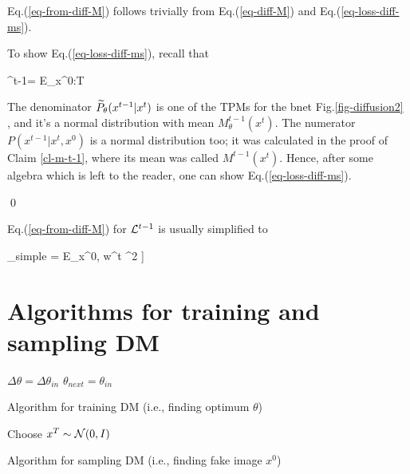 Eq.(\ref{eq-from-diff-M})
 follows trivially from
Eq.(\ref{eq-diff-M})
and Eq.(\ref{eq-loss-diff-ms}).

To show Eq.(\ref{eq-loss-diff-ms}),
 recall that

\beq
\call^{t-1}=
E_{x^{0:T}}
\eeq

The denominator
${\widetilde{P}_\theta}(x^{t-1}|x^t)$
is one of the TPMs for
the bnet Fig.\ref{fig-diffusion2} ,
and it's a normal distribution
with mean $M^{t-1}_\theta(x^t)$.
The numerator
$P(x^{t-1}|x^t,x^0)$ is
a normal distribution too;
it was calculated
in the proof
of Claim \ref{cl-m-t-1},
where its mean was called
$M^{t-1}(x^t)$.
Hence, after
some algebra
which is left to the
reader,
one can show Eq.(\ref{eq-loss-diff-ms}). 


\qed

Eq.(\ref{eq-from-diff-M})
for ${\cal L}^{t-1}$
is usually simplified to

\beq
\call_{simple} =
E_{x^0, w^t}
\left[
\left[w^t-n^{t-1}_\theta(
\sqrt{\prodalp}\; x^{0}
 +\sqrt{1-\prodalp}\;w^t
)\right]^2
\right]
\label{eq-diff-loss-simple}
\eeq

\section{Algorithms for training
and sampling DM}

\begin{algorithm}
	\DontPrintSemicolon
    $\Delta\theta = \Delta\theta_{in}$\;
    $\theta_{next} = \theta_{in}$\;
    \caption{Algorithm for training DM (i.e., finding optimum $\theta$)}
\end{algorithm}

\begin{algorithm}
	\DontPrintSemicolon
    Choose $x^T\sim{\cal N}(0, I)$\;
    \caption{Algorithm for sampling DM (i.e., finding fake image $x^0$)}
\end{algorithm}